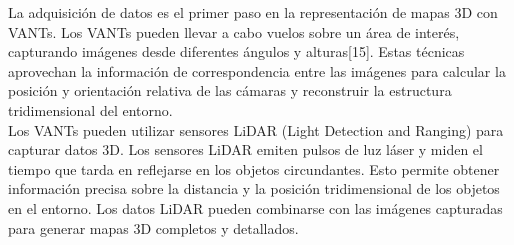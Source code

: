 \documentclass[11pt,epsf,times]{article}
\begin{document}



La adquisición de datos es el primer paso en la representación de mapas 3D con VANTs. Los VANTs pueden llevar a cabo vuelos sobre un área de interés, capturando imágenes desde diferentes ángulos y alturas[15]. Estas técnicas aprovechan la información de correspondencia entre las imágenes para calcular la posición y orientación relativa de las cámaras y reconstruir la estructura tridimensional del entorno.\\

Los VANTs pueden utilizar sensores LiDAR (Light Detection and Ranging) para capturar datos 3D. Los sensores LiDAR emiten pulsos de luz láser y miden el tiempo que tarda en reflejarse en los objetos circundantes. Esto permite obtener información precisa sobre la distancia y la posición tridimensional de los objetos en el entorno. Los datos LiDAR pueden combinarse con las imágenes capturadas para generar mapas 3D completos y detallados.\\

\end{document}
